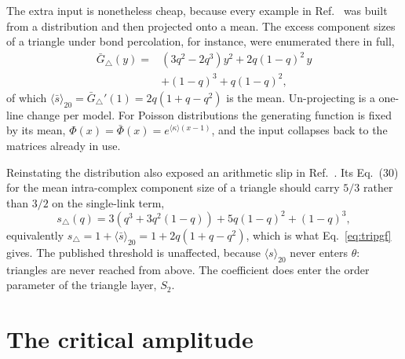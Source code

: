 \documentclass[aps,pre,twocolumn,superscriptaddress,floatfix,longbibliography]{revtex4-2}
\newcommand{\ave}[1]{\langle #1 \rangle}
\begin{document}
The extra input is nonetheless cheap, because every example in
Ref.~\cite{vazquez2024comnet} was built from a distribution and then projected
onto a mean. The excess component sizes of a triangle under bond percolation,
for instance, were enumerated there in full,
\begin{align}
  \bar G_\triangle(y)=&\left(3q^2-2q^3\right)y^2+2q(1-q)^2\,y\nonumber\\
    &+(1-q)^3+q(1-q)^2,
  \label{eq:tripgf}
\end{align}
of which $\ave{\bar s}_{20}=\bar G_\triangle'(1)=2q(1+q-q^2)$ is the mean.
Un-projecting is a one-line change per model. For Poisson distributions the
generating function is fixed by its mean, $\Phi(x)=\bar\Phi(x)=
e^{\ave{\kappa}(x-1)}$, and the input collapses back to the matrices already in
use.

Reinstating the distribution also exposed an arithmetic slip in
Ref.~\cite{vazquez2024comnet}. Its Eq.~(30) for the mean intra-complex
component size of a triangle should carry $5/3$ rather than $3/2$ on the
single-link term,
\begin{equation}
  s_\triangle(q)=3\left(q^3+3q^2(1-q)\right)+5q(1-q)^2+(1-q)^3,
\end{equation}
equivalently $s_\triangle=1+\ave{\bar s}_{20}=1+2q(1+q-q^2)$, which is what
Eq.~\eqref{eq:tripgf} gives. The published threshold is unaffected, because
$\ave{s}_{20}$ never enters $\theta$: triangles are never reached from above.
The coefficient does enter the order parameter of the triangle layer, $S_2$.

\section{The critical amplitude}\label{sec:amplitude}
\end{document}
